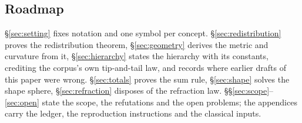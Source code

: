 \subsection{Roadmap}

\S\ref{sec:setting} fixes notation and one symbol per concept. \S\ref{sec:redistribution} proves
the redistribution theorem, \S\ref{sec:geometry} derives the metric and curvature from it,
\S\ref{sec:hierarchy} states the hierarchy with its constants, crediting the corpus's own
tip-and-tail law, and records where earlier drafts of this paper were wrong.
\S\ref{sec:totals} proves the sum rule, \S\ref{sec:shape} solves the shape sphere,
\S\ref{sec:refraction} disposes of the refraction law. \S\S\ref{sec:scope}--\ref{sec:open} state
the scope, the refutations and the open problems; the appendices carry the ledger, the
reproduction instructions and the classical inputs.
